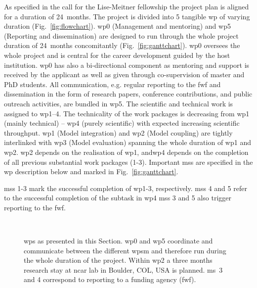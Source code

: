 As specified in the call for the Lise-Meitner fellowship the project plan is aligned for a duration of 24~months. The project is divided into 5 tangible \gls{wp} of varying duration (Fig.~\ref{fig:flowchart}). \gls{wp}0 (Management and mentoring) and \gls{wp}5 (Reporting and dissemination) are designed to run through the whole project duration of 24~months concomitantly (Fig.~\ref{fig:ganttchart}). \gls{wp}0 oversees the whole project and is central for the career development guided by the host institution. \gls{wp}0 has also a bi-directional component as mentoring and support is received by the applicant as well as given through co-supervision of master and PhD students. All communication, e.g. regular reporting to the \gls{fwf} and dissemination in the form of research papers, conference contributions, and public outreach activities, are bundled in \gls{wp}5. The scientific and technical work is assigned to \gls{wp}1--4. The technicality of the work packages is decreasing from \gls{wp}1 (mainly technical) -- \gls{wp}4 (purely scientific) with expected increasing scientific throughput. \gls{wp}1 (Model integration) and \gls{wp}2 (Model coupling) are tightly interlinked with \gls{wp}3 (Model evaluation) spanning the whole duration of \gls{wp}1 and \gls{wp}2. \gls{wp}2 depends on the realisation of \gls{wp}1, and\gls{wp}4 depends on the completion of all previous substantial work packages (1-3). Important \glspl{ms} are specified in the \gls{wp} description below and marked in Fig.~\ref{fig:ganttchart}.

\glspl{ms} 1-3 mark the successful completion of \gls{wp}1-3, respectively. \glspl{ms} 4 and 5 refer to the successful completion of the subtask in \gls{wp}4 \glspl{ms} 3 and 5 also trigger reporting to the \gls{fwf}.

\begin{figure}[!ht]
  \centering
  \\
  \caption{\glspl{wp} as presented in this Section. \gls{wp}0 and \gls{wp}5 coordinate and communicate between the different \glspl{wp}m and therefore run during the whole duration of the project. Within \gls{wp}2 a three months research stay at \gls{ncar} lab in Boulder, COL, USA is planned. \gls{ms}~3 and 4 correspond to reporting to a funding agency (\gls{fwf}).}
  \label{fig:chart}
\end{figure}

